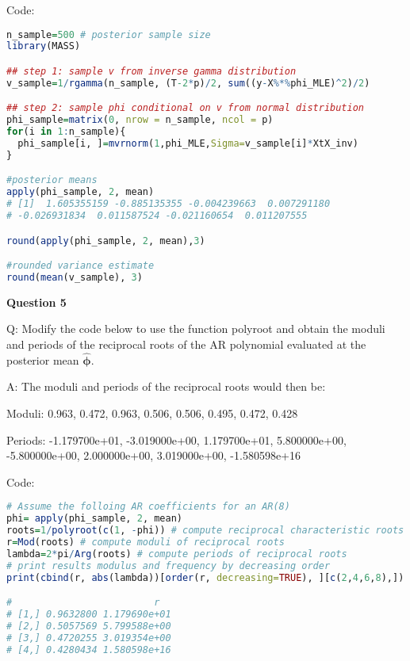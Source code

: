 \documentclass[8p, a4paper] {article}
\begin{document}
\vspace{15}
\noindent
Code:

\tiny
\begin{lstlisting}[language=R]
n_sample=500 # posterior sample size
library(MASS)

## step 1: sample v from inverse gamma distribution
v_sample=1/rgamma(n_sample, (T-2*p)/2, sum((y-X%*%phi_MLE)^2)/2)

## step 2: sample phi conditional on v from normal distribution
phi_sample=matrix(0, nrow = n_sample, ncol = p)
for(i in 1:n_sample){
  phi_sample[i, ]=mvrnorm(1,phi_MLE,Sigma=v_sample[i]*XtX_inv)
}

#posterior means
apply(phi_sample, 2, mean)
# [1]  1.605355159 -0.885135355 -0.004239663  0.007291180 
# -0.026931834  0.011587524 -0.021160654  0.011207555

round(apply(phi_sample, 2, mean),3)

#rounded variance estimate
round(mean(v_sample), 3)
\end{lstlisting}



\normalsize

\newpage

\noindent
\begin{center}
\textbf{\huge Question 5}
\end{center}


\vspace{15}
\noindent
Q: Modify the code below to use the function polyroot and obtain the moduli and periods of the reciprocal roots of the AR polynomial evaluated at the posterior mean $\hat{\boldsymbol{\phi}}$.

\vspace{15}
\noindent
A: The moduli and periods of the reciprocal roots would then be: 


\vspace{5}
\noindent
Moduli: 0.963, 0.472, 0.963, 0.506, 0.506, 0.495, 0.472, 0.428


\vspace{5}
\noindent
Periods: -1.179700e+01, -3.019000e+00,  1.179700e+01,  5.800000e+00, -5.800000e+00,  2.000000e+00,  3.019000e+00, -1.580598e+16



\vspace{15}
\noindent
Code:

\tiny
\begin{lstlisting}[language=R]
# Assume the folloing AR coefficients for an AR(8)
phi= apply(phi_sample, 2, mean)
roots=1/polyroot(c(1, -phi)) # compute reciprocal characteristic roots
r=Mod(roots) # compute moduli of reciprocal roots
lambda=2*pi/Arg(roots) # compute periods of reciprocal roots
# print results modulus and frequency by decreasing order
print(cbind(r, abs(lambda))[order(r, decreasing=TRUE), ][c(2,4,6,8),]) 

#                         r             
# [1,] 0.9632800 1.179690e+01
# [2,] 0.5057569 5.799588e+00
# [3,] 0.4720255 3.019354e+00
# [4,] 0.4280434 1.580598e+16
\end{lstlisting}



\normalsize
\end{document}
